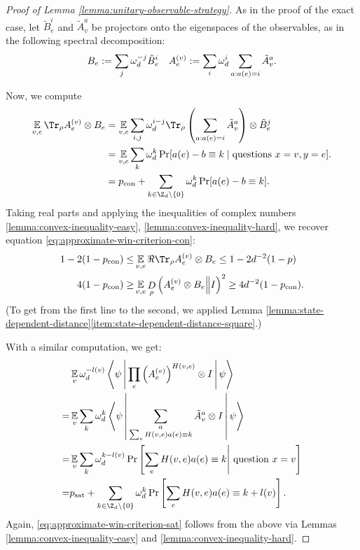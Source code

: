 \begin{proof}[Proof of Lemma \ref{lemma:unitary-observable-strategy}]
	As in the proof of the exact case, let $\tilde B^i_e$ and $\tilde A_v^a$ be projectors onto the eigenspaces of the observables, as in the following spectral decomposition:
	\begin{align}
		B_e:= \sum_j\omega_d^{-j}\tilde B^{i}_{e}
		&& 
		A_e^{(v)}:= \sum_i \omega_d^i\sum_{a: a(e) =i} \tilde A_{v}^a.
	\end{align}

	Now, we compute
	\begin{align}
		\E{v,e}\Tr_\rho A_e^{(v)}\otimes B_e 
			&= \E{v,e}\sum_{i,j}\w_d^{i-j}\Tr_\rho \left(\sum_{a: a(e) =i} \tilde A_{v}^a\right)\otimes \tilde B^{j}_{e} 
		\\	&= \E{v,e}\sum_k \w_d^k\Pr[a(e) - b \equiv k\mid \text{questions }x=v, y=e].
		\\	&= p_\text{con} + \sum_{k\in \Z_d\minus\set 0} \w_d^k\Pr[a(e) - b \equiv k].
	\end{align}
	Taking real parts and applying the inequalities of complex numbers \ref{lemma:convex-inequality-easy}, \ref{lemma:convex-inequality-hard}, we recover equation \eqref{eq:approximate-win-criterion-con}:
	\begin{align}
		1 - 2 (1 - p_\text{con})
		\leq
		&\E{v,e} \Re\Tr_\rho A_e^{(v)}\otimes B_e
		\leq 
		1 - 2d^{-2}(1-p)
		\\
		4 (1-p_\text{con})
		\geq
		&\E{v,e} \drho{\rho}{A_e^{(v)}\otimes B_e}{I}^2
		\geq 
		4 d^{-2}(1-p_\text{con}).
	\end{align}
	(To get from the first line to the second, we applied Lemma \ref{lemma:state-dependent-distance}\eqref{item:state-dependent-distance-square}.)
	

	With a similar computation, we get:
	\begin{align}
		 &\E{v}\w_d^{-l(v)}\Braket {\psi |\prod_{e} \left(A_e^{(v)}\right)^{H(v,e)}\otimes I | \psi } \\
		= & \E{v}\sum_k\w_d^{k}\Braket {\psi |\sum_{\substack{a\\ \sum_e H(v,e)a(e)\equiv k}} \tilde A_{v}^a\otimes I |\psi} \\
		= & \E{v}\sum_k \w_d^{k-l(v)}\Pr\left[\sum_{e}H(v,e)a(e)\equiv k\middle| \text{ question }x=v\right]\\
		= & p_\text{sat} + \sum_{k\in \Z_d\minus\set 0} \w_d^k\Pr\left[\sum_{e}H(v,e)a(e)\equiv k+l(v)\right].
	\end{align}
	Again, \eqref{eq:approximate-win-criterion-sat} follows from the above via Lemmas \ref{lemma:convex-inequality-easy} and \ref{lemma:convex-inequality-hard}.
\end{proof}


